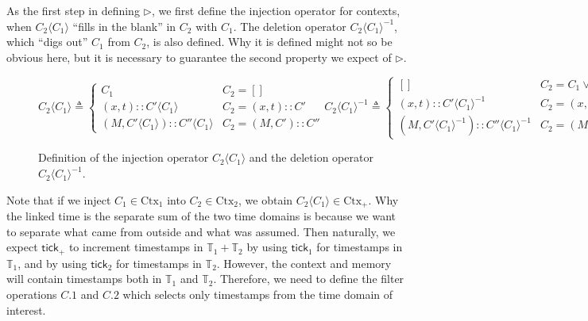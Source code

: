\documentclass{article}
\theoremstyle{definition}
\newcommand*{\cons}{::}
\newcommand*{\Time}{\mathbb{T}}
\newcommand*{\Ctx}{\text{Ctx}}
\newcommand*{\tick}{\mathsf{tick}}
\newcommand*{\inject}[2]{{#2}\langle{#1}\rangle}
\newcommand*{\delete}[2]{{#2}{\langle{#1}\rangle}^{-1}}
\begin{document}
As the first step in defining $\rhd$, we first define the injection operator for contexts, when $\inject{C_1}{C_2}$ ``fills in the blank'' in $C_2$ with $C_1$.
The deletion operator $\delete{C_1}{C_2}$, which ``digs out'' $C_1$ from $C_2$, is also defined.
Why it is defined might not so be obvious here, but it is necessary to guarantee the second property we expect of $\rhd$.
\begin{figure}[h!]
  \[
    \inject{C_{1}}{C_{2}}\triangleq
    \begin{cases}
      C_1                                             & C_{2}=[]              \\
      (x, t)\cons\inject{C_{1}}{C'}                   & C_{2}=(x,t)\cons C'   \\
      (M, \inject{C_{1}}{C'})\cons\inject{C_{1}}{C''} & C_{2}=(M,C')\cons C''
    \end{cases}
    \delete{C_{1}}{C_{2}}\triangleq
    \begin{cases}
      []                                              & C_{2}=C_{1}\lor C_{2}=[] \\
      (x,t)\cons\delete{C_{1}}{C'}                    & C_{2}=(x,t)\cons C'      \\
      (M, \delete{C_{1}}{C'})\cons\delete{C_{1}}{C''} & C_{2}=(M, C')\cons C''
    \end{cases}
  \]
  \caption{Definition of the injection operator $\inject{C_1}{C_2}$ and the deletion operator $\delete{C_1}{C_2}$.}
  \label{fig:concinject}
\end{figure}

Note that if we inject $C_1\in\Ctx_1$ into $C_2\in\Ctx_2$, we obtain $\inject{C_1}{C_2}\in\Ctx_+$.
Why the linked time is the separate sum of the two time domains is because we want to separate what came from outside and what was assumed.
Then naturally, we expect $\tick_+$ to increment timestamps in $\Time_1+\Time_2$ by using $\tick_1$ for timestamps in $\Time_1$, and by using $\tick_2$ for timestamps in $\Time_2$.
However, the context and memory will contain timestamps both in $\Time_1$ and $\Time_2$.
Therefore, we need to define the filter operations $C.1$ and $C.2$ which selects only timestamps from the time domain of interest.
\end{document}
